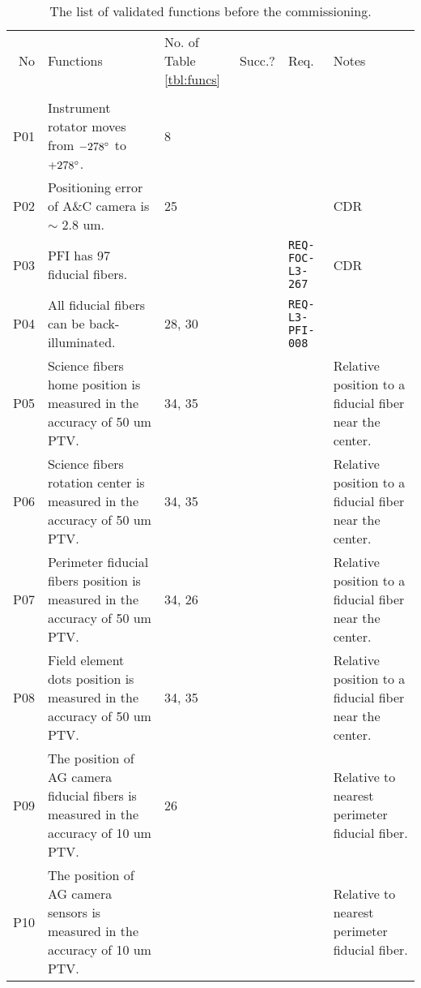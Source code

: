 

\begin{landscape}
\begin{longtable}{r|p{100mm}|p{25mm}|c|p{30mm}|p{50mm}}
\caption{
The list of validated functions before the commissioning.}
\label{tbl:subfuncs} 
\footnotesize
\\ \hline
No	& Functions & No. of Table \ref{tbl:funcs} & Succ.?  & Req.	& Notes \\ \hline \hline
\endhead
\endfoot
\multicolumn{6}{l}{\hspace{5mm} {\bf PFI (including Cable C)}} \\ \hline
P01	& Instrument rotator moves from $-278 ^\circ$ to $+278 ^\circ$.	& 8	&	&	& \\ \hline
P02	& Positioning error of A\&C camera is $\sim$ 2.8 um.	& 25	&	&	& CDR \\ \hline
P03 & PFI has 97 fiducial fibers.	&	& 	& {\tt REQ-FOC-L3-267}	& CDR \\ \hline 
P04 & All fiducial fibers can be back-illuminated.	&  28, 30	& 	& {\tt REQ-L3-PFI-008}	& \\ \hline
P05 & Science fibers home position is measured in the accuracy of 50 um PTV.	& 34, 35	& 	&	& Relative position to a fiducial fiber near the center. \\ \hline
P06 & Science fibers rotation center is measured in the accuracy of 50 um PTV.	& 34, 35	& 	&	& Relative position to a fiducial fiber near the center. \\ \hline
P07 & Perimeter fiducial fibers position is measured in the accuracy of 50 um PTV.	& 34, 26	& 	&	& Relative position to a fiducial fiber near the center. \\ \hline
P08 & Field element dots position is measured in the accuracy of 50 um PTV.	& 34, 35	& 	&	& Relative position to a fiducial fiber near the center. \\ \hline
P09 & The position of AG camera fiducial fibers is measured in the accuracy of 10 um PTV.	& 26	& 	&	& Relative to nearest perimeter fiducial fiber. \\ \hline
P10 & The position of AG camera sensors is measured in the accuracy of 10 um PTV.	& 	& 	&	& Relative to nearest perimeter fiducial fiber. \\ \hline

\end{longtable}
\end{landscape}
